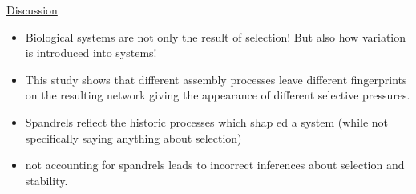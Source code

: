\underline{Discussion}
\begin{itemize}
	\item Biological systems are not only the result of selection! But also how variation is introduced into systems!
	\item This study shows that different assembly processes leave different fingerprints on the resulting network giving the appearance of different selective pressures.
	\item Spandrels reflect the historic processes which shap	ed a system (while not specifically saying anything about selection)
	\item not accounting for spandrels leads to incorrect inferences about selection and stability.
\end{itemize}